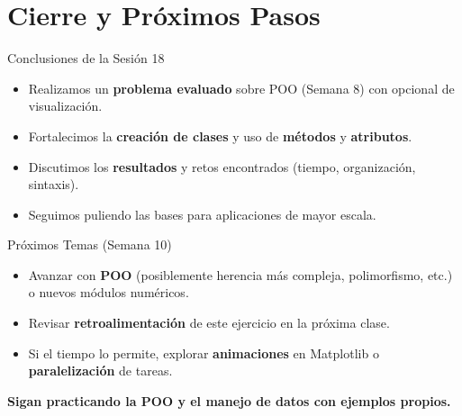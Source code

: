 \documentclass[10pt]{beamer}
\begin{document}
\section{Cierre y Próximos Pasos}

\begin{frame}{Conclusiones de la Sesión 18}
  \begin{itemize}
    \item Realizamos un \textbf{problema evaluado} sobre POO (Semana 8) con opcional de visualización.
    \item Fortalecimos la \textbf{creación de clases} y uso de \textbf{métodos} y \textbf{atributos}.
    \item Discutimos los \textbf{resultados} y retos encontrados (tiempo, organización, sintaxis).
    \item Seguimos puliendo las bases para aplicaciones de mayor escala.
  \end{itemize}
\end{frame}

\begin{frame}{Próximos Temas (Semana 10)}
  \begin{itemize}
    \item Avanzar con \textbf{POO} (posiblemente herencia más compleja, polimorfismo, etc.) o nuevos módulos numéricos.
    \item Revisar \textbf{retroalimentación} de este ejercicio en la próxima clase.
    \item Si el tiempo lo permite, explorar \textbf{animaciones} en Matplotlib o \textbf{paralelización} de tareas.
  \end{itemize}
  \vspace{0.3cm}
  \textbf{Sigan practicando la POO y el manejo de datos con ejemplos propios.}
\end{frame}
\end{document}
